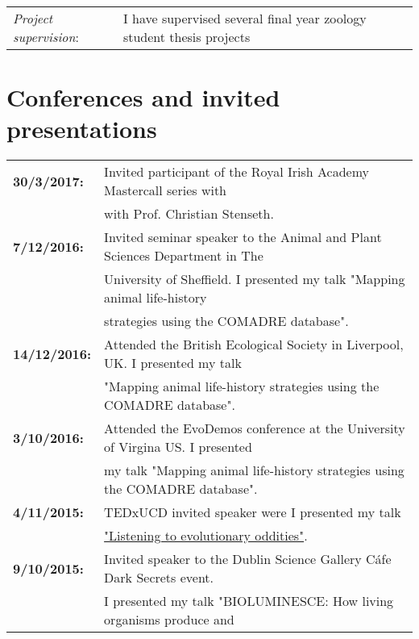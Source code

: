 \documentclass[10pt,a4paper]{article}
\begin{document}
\begin{tabular}{ll}
\textit{Project supervision}:&\hspace{5.7mm} I have supervised several final year zoology student thesis projects\\

\end{tabular}





\section{Conferences and invited presentations}

\raggedright
\begin{tabular}{ll}
\textbf{30/3/2017:} & Invited participant of the Royal Irish Academy Mastercall series with\\
& with Prof. Christian Stenseth.\\
\textbf{7/12/2016:} & Invited seminar speaker to the Animal and Plant Sciences Department in The\\
& University of Sheffield. I presented my talk "Mapping animal life-history\\
& strategies using the COMADRE database".\\
\textbf{14/12/2016:} & Attended the British Ecological Society in Liverpool, UK. I presented my talk\\ 
& "Mapping animal life-history strategies using the COMADRE database".\\ 
\textbf{3/10/2016:} & Attended the EvoDemos conference at the University of Virgina US. I presented\\ 
& my talk "Mapping animal life-history strategies using the COMADRE database".\\
\textbf{4/11/2015:} & TEDxUCD invited speaker were I presented my talk\\
& \href{https://www.youtube.com/watch?v=-CHtfWEKifY}{"Listening to evolutionary oddities"}.\\ 
\textbf{9/10/2015:} & Invited speaker to the Dublin Science Gallery Cáfe Dark Secrets event.\\ 
& I presented my talk "BIOLUMINESCE: How living organisms produce and\\ 

\end{tabular}
\end{document}
